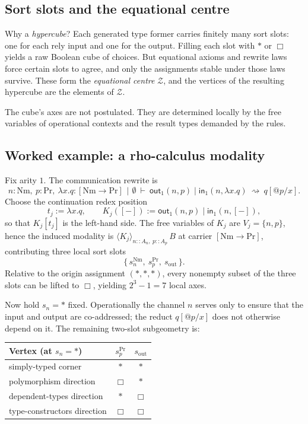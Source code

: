 \documentclass[11pt]{article}
\theoremstyle{definition}
\theoremstyle{plain}
\theoremstyle{remark}
\renewcommand{\Pr}{\mathrm{Pr}}
\newcommand{\Nm}{\mathrm{Nm}}
\newcommand{\rsq}{\rightsquigarrow}
\newcommand{\angles}[3]{\langle #1 \rangle_{#2}\,#3}
\newcommand{\Zc}{\mathcal{Z}}
\newcommand{\ctxbar}{\,|\,}
\begin{document}
\subsection{Sort slots and the equational centre}

Why a \emph{hypercube}? Each generated type former carries finitely many sort slots: one
for each rely input and one for the output. Filling each slot with $\ast$ or $\Box$ yields
a raw Boolean cube of choices. But equational axioms and rewrite laws force certain slots
to agree, and only the assignments stable under those laws survive. These form the
\emph{equational centre} $\Zc$, and the vertices of the resulting hypercube are the
elements of $\Zc$.

The cube's axes are not postulated. They are determined locally by the free variables of
operational contexts and the result types demanded by the rules.

\subsection{Worked example: a rho-calculus modality}
\label{subsec:rho-modality}

Fix arity $1$. The communication rewrite is
\[
  n{:}\Nm,\ p{:}\Pr,\ \lambda x.q : [\Nm \to \Pr] \ \ctxbar\ \emptyset \ \vdash\
  \mathsf{out}_1(n,p) \mid \mathsf{in}_1(n, \lambda x.q) \ \rsq\ q[@p/x] .
\]
Choose the continuation redex position
\[
  t_j := \lambda x.q, \qquad K_j([-]) := \mathsf{out}_1(n,p) \mid \mathsf{in}_1(n,[-]) ,
\]
so that $K_j[t_j]$ is the left-hand side. The free variables of $K_j$ are
$V_j = \{n,p\}$, hence the induced modality is $\angles{K_j}{n :: A_n,\ p :: A_p}{B}$ at
carrier $[\Nm \to \Pr]$, contributing three local sort slots
\[
  \{\, s_n^{\Nm},\ s_p^{\Pr},\ s_{\mathrm{out}} \,\} .
\]
Relative to the origin assignment $(\ast,\ast,\ast)$, every nonempty subset of the three
slots can be lifted to $\Box$, yielding $2^3 - 1 = 7$ local axes.

Now hold $s_n = \ast$ fixed. Operationally the channel $n$ serves only to ensure that the
input and output are co-addressed; the reduct $q[@p/x]$ does not otherwise depend on it.
The remaining two-slot subgeometry is:

\begin{center}
\begin{tabular}{@{}lcc@{}}
\toprule
\textbf{Vertex (at $s_n = \ast$)} & $s_p^{\Pr}$ & $s_{\mathrm{out}}$ \\
\midrule
simply-typed corner        & $\ast$ & $\ast$ \\
polymorphism direction     & $\Box$ & $\ast$ \\
dependent-types direction  & $\ast$ & $\Box$ \\
type-constructors direction& $\Box$ & $\Box$ \\
\bottomrule
\end{tabular}
\end{center}
\end{document}
